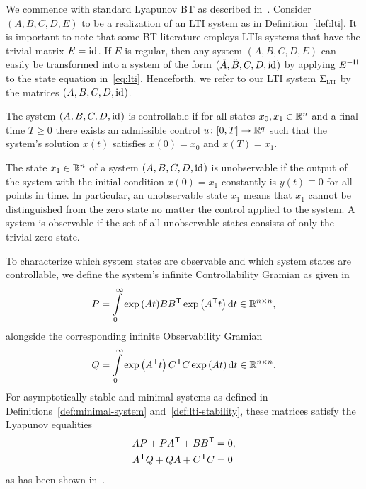 We commence with standard Lyapunov \ac{BT} as described in~\cite{BB2017}.
Consider $(A, B, C, D, E)$ to be a realization of an \ac{LTI} system as in Definition~\ref{def:lti}.
It is important to note that some \ac{BT} literature employs \acp{LTI} systems that have the trivial matrix $E = \text{id}_{}$.
If $E$ is regular, then any system $(A, B, C, D, E)$ can easily be transformed into a system of the form $(\tilde{A}, \tilde{B}, C, D, \text{id}_{})$ by applying $E\inv$ to the state equation in~\eqref{eq:lti}.
Henceforth, we refer to our \ac{LTI} system $\Sigma_{\textnormal{\scshape lti}}$ by the matrices $(A, B, C, D, \text{id}_{})$.

\begin{definition}\label{def:controllability}
    The system $(A, B, C, D, \text{id}_{})$ is controllable if for all states $x_0, x_1 \in \mathbb{R}^n$ and a final time $T \geq 0$ there exists an admissible control $u \colon \interval{0}{T} \to \bb{R}^q$ such that the system's solution $x(t)$ satisfies $x(0) = x_0$ and $x(T) = x_1$.
\end{definition}

\begin{definition}\label{def:observability}
    The state $x_1 \in \mathbb{R}^n$ of a system $(A, B, C, D, \text{id}_{})$ is unobservable if the output of the system with the initial condition $x(0) = x_1$ constantly is $y(t) \equiv 0$ for all points in time.
    In particular, an unobservable state $x_1$ means that $x_1$ cannot be distinguished from the zero state no matter the control applied to the system.
    A system is observable if the set of all unobservable states consists of only the trivial zero state.
\end{definition}

To characterize which system states are observable and which system states are controllable, we define the system's infinite Controllability Gramian as given in~\cite[Equation~6.8]{BB2017}
\begin{equation}\label{eq:controllability-gramian}
    P = \int\limits_0^\infty \exp{(A t)} B B^{\mkern1mu \mathsf{T}} \exp \left( A^{\mkern1mu \mathsf{T}} t \right) \mathop{}\!\mathrm{d} t \in \mathbb{R}^{n \times n},
\end{equation}
alongside the corresponding infinite Observability Gramian
\begin{equation}\label{eq:observability-gramian}
    Q = \int\limits_0^\infty \exp \left( A^{\mkern1mu \mathsf{T}} t \right) C^{\mkern1mu \mathsf{T}} C \exp{(A t)} \mathop{}\!\mathrm{d} t \in \mathbb{R}^{n \times n}.
\end{equation}
For asymptotically stable and minimal systems as defined in Definitions~\ref{def:minimal-system} and~\ref{def:lti-stability}, these matrices satisfy the Lyapunov equalities
\begin{equation}\label{eq:lyapunov-equations}
    \begin{aligned}
        A P + P A^{\mkern1mu \mathsf{T}} + B B^{\mkern1mu \mathsf{T}} &= 0, \\
        A^{\mkern1mu \mathsf{T}} Q + Q A + C^{\mkern1mu \mathsf{T}} C &= 0
    \end{aligned}
\end{equation}
as has been shown in~\cite{Antoulas2005, Hinrichsen2005}.

